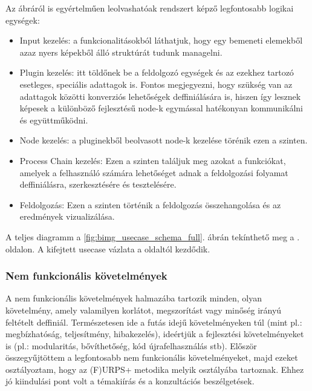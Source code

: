 \documentclass[a4paper,12pt,oneside]{report}
\begin{document}
Az ábráról is egyértelműen leolvashatóak rendszert képző legfontosabb logikai egységek:
\begin{itemize}
	\itemsep0em
	\item Input kezelés: a funkcionalitásokból láthatjuk, hogy egy bemeneti elemekből azaz nyers képekből álló struktúrát tudunk managelni.
	\item Plugin kezelés: itt töldőnek be a feldolgozó egységek és az ezekhez tartozó esetleges, speciális adattagok is. Fontos megjegyezni, hogy szükség van az adattagok közötti konverziós lehetőségek deffiniálására is, hiszen így lesznek képesek a különböző fejlesztésű node-k egymással hatékonyan kommunikálni és együttműködni.
	\item Node kezelés: a pluginekből beolvasott node-k kezelése törénik ezen a szinten.
	\item Process Chain kezelés: Ezen a szinten találjuk meg azokat a funkciókat, amelyek a felhasználó számára lehetőséget adnak a feldolgozási folyamat deffiniálásra, szerkesztésére és tesztelésére.
	\item Feldolgozás: Ezen a szinten történik a feldolgozás összehangolása és az eredmények vizualizálása.
\end{itemize}
A teljes diagramm a \ref{fig:bimg_usecase_schema_full}. ábrán tekínthető meg a \pageref{fig:bimg_usecase_schema_full}. oldalon. A kifejtett usecase vázlata a \pageref{fig:bimg_usecase_schema_full} oldaltól kezdődik.

\subsubsection{Nem funkcionális követelmények}
A nem funkcionális követelmények halmazába tartozik minden, olyan követelmény, amely valamilyen korlátot, megszorítást vagy minőség irányú feltételt deffiniál. \cite{publication:soft_nonfunc_req} Természetesen ide a futás idejű követelményeken túl (mint pl.: megbízhatóság, teljesítmény, hibakezelés), ideértjük a fejlesztési követelményeket is (pl.: modularitás, bővíthetőség, kód újrafelhasználás stb). Először összegyűjtöttem a legfontosabb nem funkcionális követelményeket, majd ezeket osztályoztam, hogy az (F)URPS+ metodika melyik osztályába tartoznak. Ehhez jó kiindulási pont volt a témakiírás és a konzultációs beszélgetések.
\end{document}

